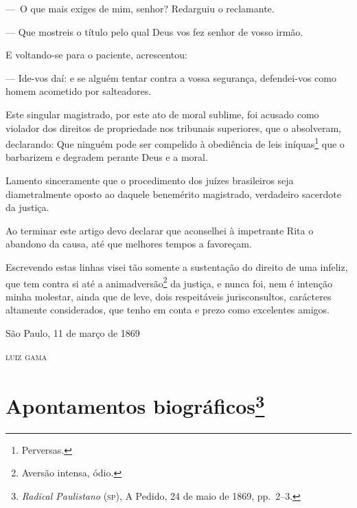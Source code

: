 ---~O que mais exiges de mim, senhor? Redarguiu o reclamante.

--- Que mostreis o título pelo qual Deus vos fez senhor de vosso irmão.

E voltando-se para o paciente, acrescentou:

--- Ide-vos daí: e se alguém tentar contra a vossa segurança,
defendei-vos como homem acometido por salteadores.

Este singular magistrado, por este ato de moral sublime, foi acusado
como violador dos direitos de propriedade nos tribunais superiores, que
o absolveram, declarando: Que ninguém pode ser compelido à obediência de
leis iníquas\footnote{Perversas.} que o barbarizem e degradem perante
Deus e a moral.

Lamento sinceramente que o procedimento dos juízes brasileiros seja
diametralmente oposto ao daquele benemérito magistrado, verdadeiro
sacerdote da justiça.

Ao terminar este artigo devo declarar que aconselhei à impetrante Rita o
abandono da causa, até que melhores tempos a favoreçam.

Escrevendo estas linhas visei tão somente a sustentação do direito de
uma infeliz, que tem contra si até a animadversão\footnote{Aversão
  intensa, ódio.} da justiça, e nunca foi, nem é intenção minha
molestar, ainda que de leve, dois respeitáveis jurisconsultos,
carácteres altamente considerados, que tenho em conta e prezo como
excelentes amigos.

\begin{flushright}
São Paulo, 11 de março de 1869

\textsc{luiz gama}
\end{flushright}

\chapter{Apontamentos biográficos\footnote{\emph{Radical Paulistano}
  (\textsc{sp}), A Pedido, 24 de maio de 1869, pp.~2--3.}}

